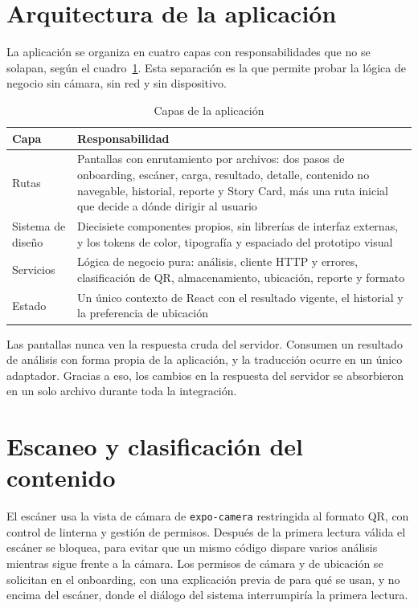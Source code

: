 \section{Arquitectura de la aplicación}

La aplicación se organiza en cuatro capas con responsabilidades que no se solapan, según el cuadro~\ref{tab:capas}. Esta separación es la que permite probar la lógica de negocio sin cámara, sin red y sin dispositivo.

\begin{table}[H]
	\centering
	\caption{Capas de la aplicación}
	\label{tab:capas}
	\begin{tabular}{@{}>{\raggedright\arraybackslash}p{3.2cm}>{\raggedright\arraybackslash}p{9.8cm}@{}}
		\toprule
		\textbf{Capa} & \textbf{Responsabilidad} \\
		\midrule
		Rutas & Pantallas con enrutamiento por archivos: dos pasos de onboarding, escáner, carga, resultado, detalle, contenido no navegable, historial, reporte y Story Card, más una ruta inicial que decide a dónde dirigir al usuario \\
		Sistema de diseño & Diecisiete componentes propios, sin librerías de interfaz externas, y los tokens de color, tipografía y espaciado del prototipo visual \\
		Servicios & Lógica de negocio pura: análisis, cliente HTTP y errores, clasificación de QR, almacenamiento, ubicación, reporte y formato \\
		Estado & Un único contexto de React con el resultado vigente, el historial y la preferencia de ubicación \\
		\bottomrule
	\end{tabular}
\end{table}

Las pantallas nunca ven la respuesta cruda del servidor. Consumen un resultado de análisis con forma propia de la aplicación, y la traducción ocurre en un único adaptador. Gracias a eso, los cambios en la respuesta del servidor se absorbieron en un solo archivo durante toda la integración.

\section{Escaneo y clasificación del contenido}

El escáner usa la vista de cámara de \texttt{expo-camera} restringida al formato QR, con control de linterna y gestión de permisos. Después de la primera lectura válida el escáner se bloquea, para evitar que un mismo código dispare varios análisis mientras sigue frente a la cámara. Los permisos de cámara y de ubicación se solicitan en el onboarding, con una explicación previa de para qué se usan, y no encima del escáner, donde el diálogo del sistema interrumpiría la primera lectura.

